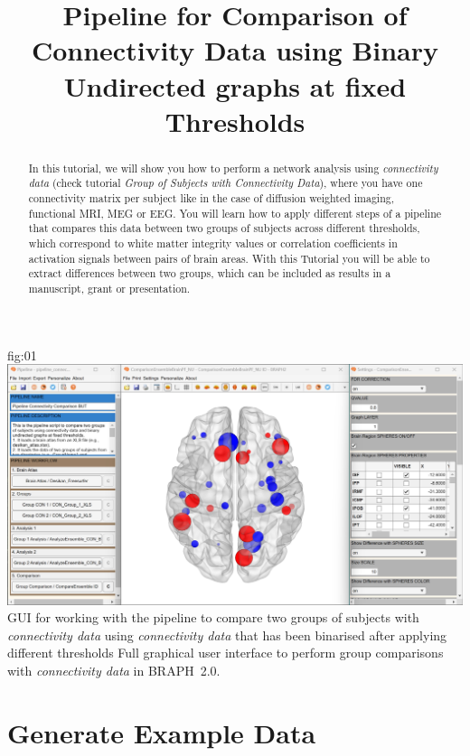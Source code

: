 \documentclass[justified]{tufte-handout}
\title{Pipeline for Comparison of Connectivity Data using Binary Undirected graphs at fixed Thresholds}
\begin{document}
\maketitle

\begin{abstract}
\noindent
In this tutorial, we will show you how to perform a network analysis using \emph{connectivity data} (check tutorial \emph{Group of Subjects with Connectivity Data}), where you have one connectivity matrix per subject like in the case of diffusion weighted imaging, functional MRI, MEG or EEG. You will learn how to apply different steps of a pipeline that compares this data between two groups of subjects across different thresholds, which correspond to white matter integrity values or correlation coefficients in activation signals between pairs of brain areas.  With this Tutorial you will be able to extract differences between two groups, which can be included as results in a manuscript, grant or presentation.
\end{abstract}

\tableofcontents

	{fig:01}
	{\includegraphics{fig01.jpg}}
	{GUI for working with the pipeline to compare two groups of subjects with \emph{connectivity data} using \emph{connectivity data} that has been binarised after applying different thresholds}
	{
	Full graphical user interface to perform group comparisons with \emph{connectivity data} in BRAPH~2.0. 
	}

\clearpage
\section{Generate Example Data}
\end{document}
